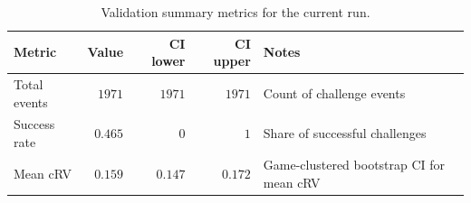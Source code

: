 \begin{table}[h]
\centering
\caption{Validation summary metrics for the current run.}
\label{tab:validation}
\small
\begin{tabular}{lrrrl}
\toprule
Metric & Value & CI lower & CI upper & Notes \\
\midrule
Total events & $1971$ & $1971$ & $1971$ & Count of challenge events \\
Success rate & $0.465$ & $0$ & $1$ & Share of successful challenges \\
Mean cRV & $0.159$ & $0.147$ & $0.172$ & Game-clustered bootstrap CI for mean cRV \\
\bottomrule
\end{tabular}
\end{table}
